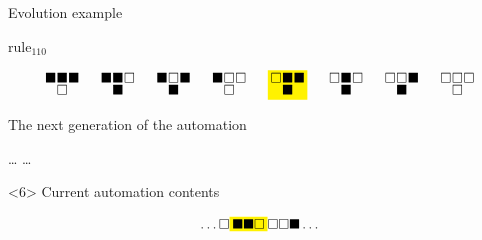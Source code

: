 \documentclass[presentation,aspectratio=169,smaller]{beamer}
\begin{document}
\begin{frame}[label={sec:org812e2ea},t]{Evolution example}
\begin{onlyenv}
\(\text{rule}_{110}\)

\begin{equation*}
  \begingroup
  \setlength\arraycolsep{0.25pt}
  \renewcommand{\arraystretch}{0.5}
  \begin{matrix}
    \blacksquare & \blacksquare & \blacksquare \\
    & \square &
  \end{matrix}\mspace{28mu}
  \begin{matrix}
    \blacksquare & \blacksquare & \square \\
    & \blacksquare &
  \end{matrix}\mspace{28mu}
  \begin{matrix}
    \blacksquare & \square & \blacksquare \\
    & \blacksquare &
  \end{matrix}\mspace{28mu}
  \begin{matrix}
    \blacksquare & \square & \square \\
    & \square &
  \end{matrix}\mspace{28mu}
  \mathcolorbox{yellow}{
    \begin{matrix}
      \square & \blacksquare & \blacksquare \\
      & \blacksquare &
    \end{matrix}
  }\mspace{28mu}
  \begin{matrix}
    \square & \blacksquare & \square \\
    & \blacksquare &
  \end{matrix}\mspace{28mu}
  \begin{matrix}
    \square & \square & \blacksquare \\
    & \blacksquare &
  \end{matrix}\mspace{28mu}
  \begin{matrix}
    \square & \square & \square \\
    & \square &
  \end{matrix}
  \endgroup
\end{equation*}

The next generation of the automation

\hfill \dots
\blacksquare
{}
\mspace{14mu}
\mspace{14mu}
\mspace{14mu}
\mspace{14mu}
\mspace{14mu}
\dots \hfill
\end{onlyenv}

\begin{onlyenv}<6>
Current automation contents

\begin{equation*}
  \hfill
  \dots
  \square
  \mathcolorbox{yellow}{
    \blacksquare
    \blacksquare
    \square
  }
  \square
  \square
  \blacksquare
  \dots
  \hfill
\end{equation*}


\end{onlyenv}
\end{frame}
\end{document}
